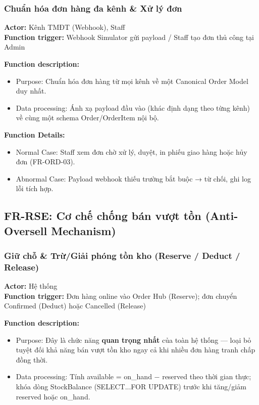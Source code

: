 \subsubsection{Chuẩn hóa đơn hàng đa kênh \& Xử lý đơn}
\textbf{Actor:} Kênh TMĐT (Webhook), Staff \\
\textbf{Function trigger:} Webhook Simulator gửi payload / Staff tạo đơn thủ công tại Admin

\textbf{Function description:}
\begin{itemize}
    \item Purpose: Chuẩn hóa đơn hàng từ mọi kênh về một Canonical Order Model duy nhất.
    \item Data processing: Ánh xạ payload đầu vào (khác định dạng theo từng kênh) về cùng một schema Order/OrderItem nội bộ.
\end{itemize}

\textbf{Function Details:}
\begin{itemize}
    \item Normal Case: Staff xem đơn chờ xử lý, duyệt, in phiếu giao hàng hoặc hủy đơn (FR-ORD-03).
    \item Abnormal Case: Payload webhook thiếu trường bắt buộc → từ chối, ghi log lỗi tích hợp.
\end{itemize}

\subsection{FR-RSE: Cơ chế chống bán vượt tồn (Anti-Oversell Mechanism)}

\subsubsection{Giữ chỗ \& Trừ/Giải phóng tồn kho (Reserve / Deduct / Release)}
\textbf{Actor:} Hệ thống \\
\textbf{Function trigger:} Đơn hàng online vào Order Hub (Reserve); đơn chuyển Confirmed (Deduct) hoặc Cancelled (Release)

\textbf{Function description:}
\begin{itemize}
    \item Purpose: Đây là chức năng \textbf{quan trọng nhất} của toàn hệ thống — loại bỏ tuyệt đối khả năng bán vượt tồn kho ngay cả khi nhiều đơn hàng tranh chấp đồng thời.
    \item Data processing: Tính available = on\_hand − reserved theo thời gian thực; khóa dòng StockBalance (SELECT...FOR UPDATE) trước khi tăng/giảm reserved hoặc on\_hand.
\end{itemize}

